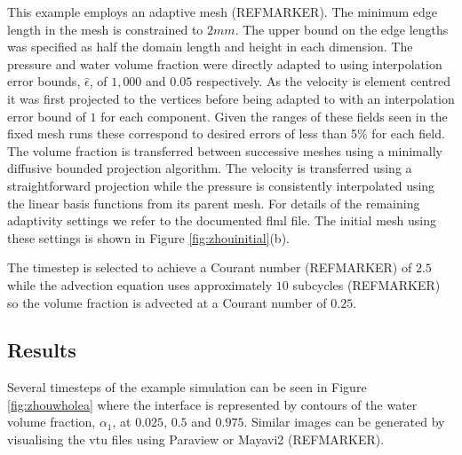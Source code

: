 This example employs an adaptive mesh (REFMARKER). The minimum edge length in the mesh is constrained to $2mm$. The upper bound on the edge lengths was specified as half the domain length and height in each dimension.  The pressure and water volume fraction were directly adapted to using interpolation error bounds, $\hat{\epsilon}$, of $1,000$ and $0.05$ respectively.  As the velocity is element centred it was first projected to the vertices before being adapted to with an interpolation error bound of $1$ for each component.  Given the ranges of these fields seen in the fixed mesh runs these correspond to desired errors of less than 5\% for each field. The volume fraction is transferred between successive meshes using a minimally diffusive bounded projection algorithm.  The velocity is transferred using a straightforward projection while the pressure is consistently interpolated using the linear basis functions from its parent mesh. For details of the remaining adaptivity settings we refer to the documented flml file.  The initial mesh using these settings is shown in Figure \ref{fig:zhouinitial}(b). 

The timestep is selected to achieve a Courant number (REFMARKER) of $2.5$ while the advection equation uses approximately $10$ subcycles (REFMARKER) so the volume fraction is advected at a Courant number of $0.25$.  

\subsection{Results}
Several timesteps of the example simulation can be seen in Figure \ref{fig:zhouwholea} where the interface is represented by contours of the water volume fraction, $\alpha_1$, at $0.025$, $0.5$ and $0.975$.  Similar images can be generated by visualising the vtu files using Paraview or Mayavi2 (REFMARKER).

